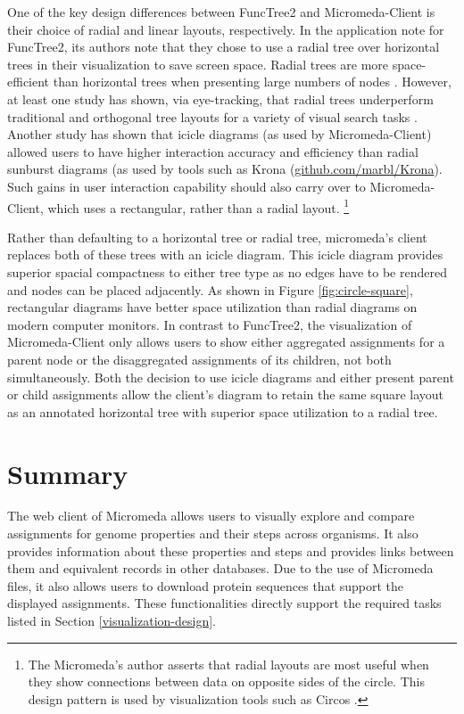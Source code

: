 One of the key design differences between FuncTree2 and Micromeda-Client is their choice of radial and linear layouts, respectively. In the application note for FuncTree2, its authors note that they chose to use a radial tree over horizontal trees in their visualization to save screen space. Radial trees are more space-efficient than horizontal trees when presenting large numbers of nodes \cite{burch2011evaluation}. However, at least one study has shown, via eye-tracking, that radial trees underperform traditional and orthogonal tree layouts for a variety of visual search tasks \cite{burch2011evaluation}. Another study has shown that icicle diagrams (as used by Micromeda-Client) allowed users to have higher interaction accuracy and efficiency \cite{muramalla2017radial} than radial sunburst diagrams (as used by tools such as Krona \cite{ondov2011interactive} (\href{github.com/marbl/Krona}{github.com/marbl/Krona}).
Such gains in user interaction capability should also carry over to Micromeda-Client, which uses a rectangular, rather than a radial layout. \footnote{The Micromeda's author asserts that radial layouts are most useful when they show connections between data on opposite sides of the circle. This design pattern is used by visualization tools such as Circos \cite{krzywinski2009circos}.} 

Rather than defaulting to a horizontal tree or radial tree, micromeda's client replaces both of these trees with an icicle diagram. This icicle diagram provides superior spacial compactness to either tree type as no edges have to be rendered and nodes can be placed adjacently. As shown in Figure \ref{fig:circle-square}, rectangular diagrams have better space utilization than radial diagrams on modern computer monitors. In contrast to FuncTree2, the visualization of Micromeda-Client only allows users to show either aggregated assignments for a parent node or the disaggregated assignments of its children, not both simultaneously. Both the decision to use icicle diagrams and either present parent or child assignments allow the client's diagram to retain the same square layout as an annotated horizontal tree with superior space utilization to a radial tree. 

\section{Summary} \label{micromeda-client-summary}

The web client of Micromeda allows users to visually explore and compare assignments for genome properties and their steps across organisms. It also provides information about these properties and steps and provides links between them and equivalent records in other databases. Due to the use of Micromeda files, it also allows users to download protein sequences that support the displayed assignments. These functionalities directly support the required tasks listed in Section \ref{visualization-design}.


